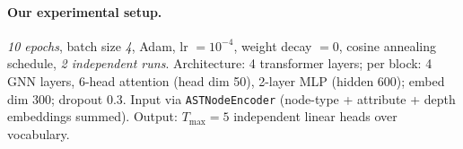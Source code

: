 \documentclass[11pt]{article}
\begin{document}
\paragraph{Our experimental setup.}
\textit{10 epochs}, batch   size \textit{4}, Adam, lr $= 10^{-4}$, weight decay $= 0$, cosine annealing schedule, \textit{2 independent runs}.
Architecture: 4 transformer layers; per block: 4 GNN layers, 6-head attention (head dim 50), 2-layer MLP (hidden 600); embed dim 300; dropout 0.3. Input via \texttt{ASTNodeEncoder} (node-type + attribute + depth embeddings summed). Output: $T_\text{max}=5$ independent linear heads over vocabulary.

\end{document}
